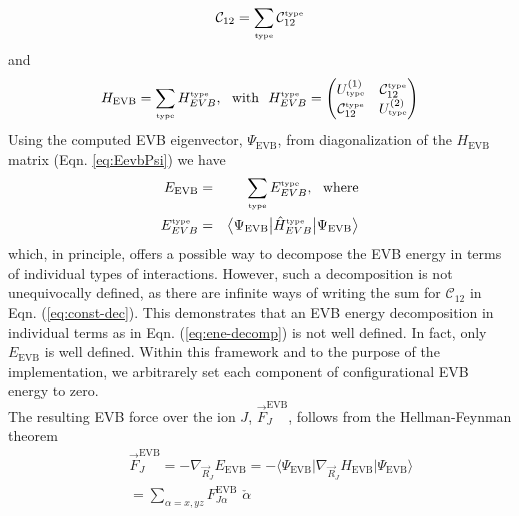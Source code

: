 \begin{equation}\label{eq:const-dec}
\mathcal{C}_{12}=\sum_{\text{\tiny{type}}} \mathcal{C}^{\text{\tiny{type}}}_{12}    
\end{equation}
and 
\begin{equation}\label{eq:evbmatrix-dec-2x2}
H_{\text{EVB}}=\sum_{\text{\tiny{type}}} H_{EVB}^{\text{\tiny{type}}},\,\,\,\, \text{with} \,\,\,\, H_{EVB}^{\text{\tiny{type}}}=\begin{pmatrix} U_{\text{\tiny{type}}}^{(1)}               & \mathcal{C}^{\text{\tiny{type}}}_{12} \\
                                                                                                                                                                             \mathcal{C}^{\text{\tiny{type}}}_{12} &  U_{\text{\tiny{type}}}^{(2)}\end{pmatrix} 
\end{equation}
Using the computed EVB eigenvector, $\Psi_{\text{EVB}}$, from diagonalization of the $H_{\text{EVB}}$ matrix (Eqn. \ref{eq:EevbPsi}) we have
\begin{eqnarray}\label{eq:evb_ene-dec-2x2}
E_{\text{EVB}}&=&\sum_{\text{\tiny{type}}} E_{EVB}^{\text{\tiny{type}}}, \,\,\,\,\text{where}\nonumber\\ 
E_{EVB}^{\text{\tiny{type}}}&=&\big\langle \Psi_{\text{EVB}}\big|\hat{H}_{EVB}^{\text{\tiny{type}}}\big| \Psi_{\text{EVB}}\big \rangle 
\end{eqnarray}
which, in principle, offers a possible way to decompose the EVB energy in terms of individual types of interactions. However, such a decomposition is not unequivocally defined, as there are infinite ways of writing the sum for $\mathcal{C}_{12}$ in Eqn. (\ref{eq:const-dec}). This demonstrates that an EVB energy decomposition in individual terms as in Eqn. (\ref{eq:ene-decomp}) is not well defined.  In fact, only $E_{\text{EVB}}$ is well defined. Within this framework and to the purpose of the implementation, we arbitrarely set each component of configurational EVB energy to zero.\\
The resulting EVB force over the ion $J$,  $\vec{F}_{J}^{\text{EVB}}$, follows from the Hellman-Feynman theorem \cite{feynman1939}
\begin{eqnarray}\label{eq:Fevb}
&&\vec{F}_{J}^{\text{EVB}}=-\nabla_{\vec{R}_J}E_{\text{EVB}}=-\big\langle \Psi_{\text{EVB}}\big| \nabla_{\vec{R}_J} \hat{H}_{\text{EVB}} \big| \Psi_{\text{EVB}}\big \rangle \nonumber \\
&&= \sum_{\alpha=x,yz} F_{J\alpha}^{\text{EVB}} \,\, \check{\alpha}
\end{eqnarray}
